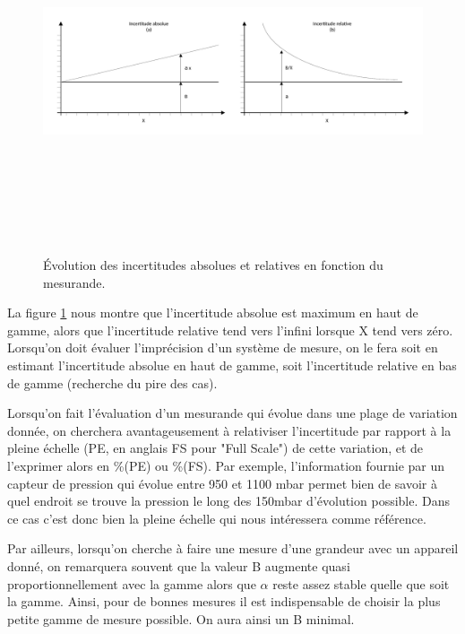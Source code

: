 \begin{figure}[h]
\centering
\includegraphics[height=10.7cm]{assets/figures/incertitudes.pdf}
\caption{Évolution des incertitudes absolues et relatives en fonction du mesurande.}
\label{fig:incertitudes_absolues_et_relatives}
\end{figure}

La figure \ref{fig:incertitudes_absolues_et_relatives} nous montre que l'incertitude absolue est maximum en haut de gamme, alors que l'incertitude relative tend vers l'infini lorsque X tend vers zéro. Lorsqu'on doit évaluer l'imprécision d'un système de mesure, on le fera soit en estimant l'incertitude absolue en haut de gamme, soit l'incertitude relative en bas de gamme (recherche du pire des cas).

Lorsqu'on fait l'évaluation d'un mesurande qui évolue dans une plage de variation donnée, on cherchera avantageusement à relativiser l'incertitude par rapport à la pleine échelle (PE, en anglais FS pour "Full Scale") de cette variation, et de l'exprimer alors en \%(PE) ou \%(FS). Par exemple, l'information fournie par un capteur de pression qui évolue entre 950 et 1100 mbar permet bien de savoir à quel endroit se trouve la pression le long des 150mbar d'évolution possible. Dans ce cas c'est donc bien la pleine échelle qui nous intéressera comme référence.

Par ailleurs, lorsqu'on cherche à faire une mesure d'une grandeur avec un appareil donné, on remarquera souvent que la valeur B augmente quasi proportionnellement avec la gamme alors que $\alpha$ reste assez stable quelle que soit la gamme. Ainsi, pour de bonnes mesures il est indispensable de choisir la plus petite gamme de mesure possible. On aura ainsi un B minimal.

